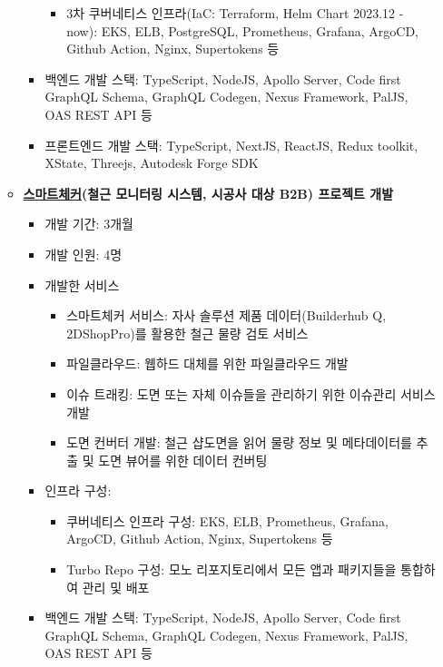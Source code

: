 \begin{itemize}[label=]
\begin{itemize}[label=]
\begin{itemize}[label=]
\begin{itemize}
				                  \item 3차 쿠버네티스 인프라(IaC: Terraform, Helm Chart 2023.12 - now): EKS, ELB, PostgreSQL, Prometheus, Grafana, ArgoCD, Github Action, Nginx, Supertokens 등
			                  \end{itemize}
			            \item 백엔드 개발 스택: TypeScript, NodeJS, Apollo Server, Code first GraphQL Schema, GraphQL Codegen, Nexus Framework, PalJS, OAS REST API 등
			            \item 프론트엔드 개발 스택: TypeScript, NextJS, ReactJS, Redux toolkit, XState, Threejs, Autodesk Forge SDK
		            \end{itemize}
		      \item \textbf{\href{https://check.builderhub.io/signin}{스마트체커}(철근 모니터링 시스템, 시공사 대상 B2B) 프로젝트 개발} \hyperref[smartchecker]{\space {}}
		            \begin{itemize}[label=]
			            \item 개발 기간: 3개월
			            \item 개발 인원: 4명
			            \item 개발한 서비스
			                  \begin{itemize}
				                  \item 스마트체커 서비스: 자사 솔루션 제품 데이터(Builderhub Q, 2DShopPro)를 활용한 철근 물량 검토 서비스
				                  \item 파일클라우드: 웹하드 대체를 위한 파일클라우드 개발
				                  \item 이슈 트래킹: 도면 또는 자체 이슈들을 관리하기 위한 이슈관리 서비스 개발
				                  \item 도면 컨버터 개발: 철근 샵도면을 읽어 물량 정보 및 메타데이터를 추출 및 도면 뷰어를 위한 데이터 컨버팅
			                  \end{itemize}
			            \item 인프라 구성:
			                  \begin{itemize}
				                  \item 쿠버네티스 인프라 구성: EKS, ELB, Prometheus, Grafana, ArgoCD, Github Action, Nginx, Supertokens 등
				                  \item Turbo Repo 구성: 모노 리포지토리에서 모든 앱과 패키지들을 통합하여 관리 및 배포
			                  \end{itemize}
			            \item 백엔드 개발 스택: TypeScript, NodeJS, Apollo Server, Code first GraphQL Schema, GraphQL Codegen, Nexus Framework, PalJS, OAS REST API 등

\end{itemize}
\end{itemize}
\end{itemize}
